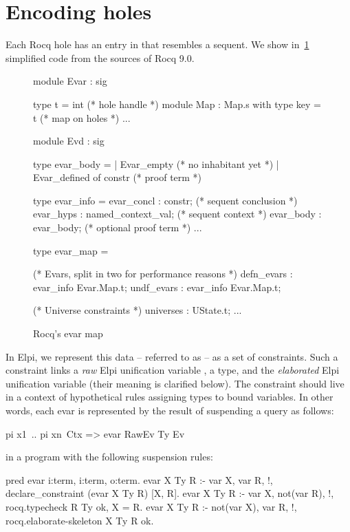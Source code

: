 \documentclass{these-ISSS}
\newenvironment{elpicode}
  {\VerbatimEnvironment\begin{elpibox}\begin{xelpicode}}{\end{xelpicode}
\end{elpibox}}
\newenvironment{ocamlcode}
  {\VerbatimEnvironment\begin{ocamlbox}\begin{xocamlcode}}{\end{xocamlcode}
\end{ocamlbox}}
\begin{document}
\section{Encoding holes}\label{sec:hoasholes}


Each Rocq hole has an entry in  that resembles a sequent.
We show in~\cref{fig:sigma} simplified code from the sources of Rocq 9.0.

\begin{figure}[h]
\begin{ocamlcode}
module Evar : sig

  type t = int                             (* hole handle    *)
  module Map : Map.s with type key = t     (* map on holes   *)
  ...

module Evd : sig

  type evar_body =
    | Evar_empty                      (* no inhabitant yet   *)
    | Evar_defined of constr          (* proof term          *)

  type evar_info = {
    evar_concl : constr;              (* sequent conclusion  *)
    evar_hyps  : named_context_val;   (* sequent context     *)
    evar_body  : evar_body;           (* optional proof term *)
    ...
  }

  type evar_map = {
    (* Evars, split in two for performance reasons *)
    defn_evars : evar_info Evar.Map.t;
    undf_evars : evar_info Evar.Map.t;

    (* Universe constraints *)
    universes  : UState.t;
    ...
  }
\end{ocamlcode}
\caption{Rocq's evar map\label{fig:sigma}}
\end{figure}

In Elpi, we represent this data -- referred to as  -- as a set of
 constraints. Such a constraint links a \emph{raw} Elpi unification
variable , a type, and the \emph{elaborated} Elpi unification variable
 (their meaning is clarified below).
The constraint should live in a context of hypothetical rules 
assigning types to bound variables. In other words, each evar is represented
by the result of suspending a query as follows:

\begin{elpicode}
  pi x1\ .. pi xn\ Ctx =>
    evar RawEv Ty Ev
\end{elpicode}

\noindent in a program with the following suspension rules:

\begin{elpicode}
pred evar i:term, i:term, o:term. %
evar X Ty R :- var X, var R,      !,
  declare_constraint (evar X Ty R) [X, R].
evar X Ty R :- var X, not(var R), !,
  rocq.typecheck R Ty ok, X = R.
evar X Ty R :- not(var X), var R, !,
  rocq.elaborate-skeleton X Ty R ok.
\end{elpicode}
\end{document}

